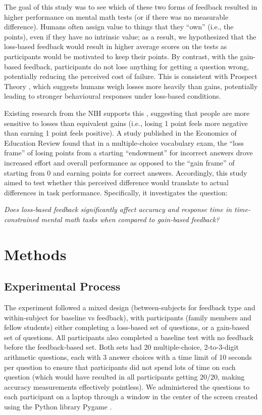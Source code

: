 \documentclass[12pt]{exam}
\begin{document}
The goal of this study was to see which of these two forms of feedback resulted in higher performance on mental math tests (or if there was no measurable difference). Humans often assign value to things that they “own” (i.e., the points), even if they have no intrinsic value; as a result, we hypothesized that the loss-based feedback would result in higher average scores on the tests as participants would be motivated to keep their points. By contrast, with the gain-based feedback, participants do not lose anything for getting a question wrong, potentially reducing the perceived cost of failure. This is consistent with Prospect Theory \cite{prospect-theory}, which suggests humans weigh losses more heavily than gains, potentially leading to stronger behavioural responses under loss-based conditions.\newline

Existing research from the NIH supports this \cite{nih-paper}, suggesting that people are more sensitive to losses than equivalent gains (i.e., losing 1 point feels more negative than earning 1 point feels positive). A study published in the Economics of Education Review \cite{econeducationrev} found that in a multiple-choice vocabulary exam, the “loss frame” of losing points from a starting “endowment” for incorrect answers drove increased effort and overall performance as opposed to the “gain frame” of starting from 0 and earning points for correct answers. Accordingly, this study aimed to test whether this perceived difference would translate to actual differences in task performance. Specifically, it investigates the question:

\begin{center}
    \textit{Does loss-based feedback significantly affect accuracy and response time in time-constrained mental math tasks when compared to gain-based feedback?}
\end{center}

\section{Methods}
\subsection{Experimental Process}
The experiment followed a mixed design (between-subjects for feedback type and within-subject for baseline vs feedback), with participants (family members and fellow students) either completing a loss-based set of questions, or a gain-based set of questions. All participants also completed a baseline test with no feedback before the feedback-based set. Both sets had 20 multiple-choice, 2-to-3-digit arithmetic questions, each with 3 answer choices with a time limit of 10 seconds per question to ensure that participants did not spend lots of time on each question (which would have resulted in all participants getting 20/20, making accuracy measurements effectively pointless). We administered the questions to each participant on a laptop through a window in the center of the screen created using the Python library Pygame \cite{pygame}. 
\end{document}
